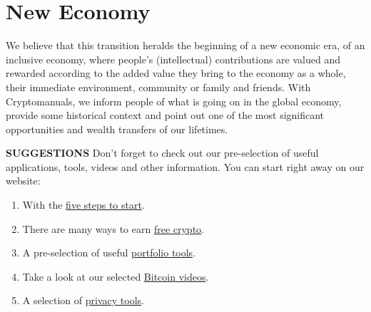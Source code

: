 \section*{New Economy}
We believe that this transition heralds the beginning of a new economic era, of an inclusive economy, where people's (intellectual) contributions are valued and rewarded according to the added value they bring to the economy as a whole, their immediate environment, community or family and friends. With Cryptomanuals, we inform people of what is going on in the global economy, provide some historical context and point out one of the most significant opportunities and wealth transfers of our lifetimes. 


    \bigskip
    \begin{cryptobox}{\textbf{SUGGESTIONS}}
        Don't forget to check out our pre-selection of useful applications, tools, videos and other information.
        \tcblower
        You can start right away on our website:
        \begin{enumerate}
            \setlength\itemsep{0em}
            \item With the \href{https://cryptomanuals.com/start-with-cryptocurrency/}{five steps to start}.
            \item There are many ways to earn   \href{https://cryptomanuals.com/free-cryptomanuals/}{free crypto}.
            \item A pre-selection of useful \href{https://cryptomanuals.com/5-tools-to-buy-trade-and-manage-your-crypto-portfolio/}{portfolio tools}.
            \item Take a look at our selected  \href{https://cryptomanuals.com/5-videos-to-start-with-bitcoin/}{Bitcoin videos}.
            \item A selection of  \href{https://cryptomanuals.com/5-applications-to-enhance-online-privacy-and-security/}{privacy tools}.
        \end{enumerate}
    \end{cryptobox}